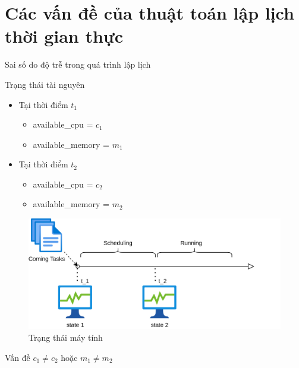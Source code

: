 \documentclass[11pt,xcolor={dvipsnames}, aspectratio=169]{beamer}
\begin{document}
\section{Các vấn đề của thuật toán lập lịch thời gian thực}

\begin{frame}
{Sai số do độ trễ trong quá trình lập lịch}
	\begin{minipage}[t]{0.4\linewidth}
		\begin{block}{Trạng thái tài nguyên}
		\begin{itemize}
			\item <2-> Tại thời điểm $t_{1}$
			\begin{itemize}
				\item available\_cpu = $c_{1}$
				\item available\_memory = $m_{1}$
			\end{itemize}
			\item <3-> Tại thời điểm $t_{2}$
			\begin{itemize}
				\item available\_cpu = $c_{2}$
				\item available\_memory = $m_{2}$
			\end{itemize}
		\end{itemize}
		\end{block}
	\end{minipage}
	\hfill
	\begin{minipage}[t]{0.59\linewidth}
		\begin{figure}
			\centering
			\includegraphics[scale=0.5]{images/state_change.png}
			\caption{Trạng thái máy tính}
		\end{figure}
	\end{minipage}
	\pause
	\pause
	\pause
	\begin{center}
		\begin{block}
		{\centering Vấn đề}
				\centering $c_{1} \neq c_{2}$ hoặc $m_{1} \neq m_{2}$
		\end{block}
	\end{center}
\end{frame}
\end{document}
